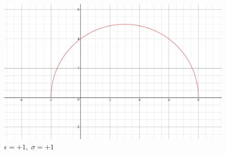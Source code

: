 \begin{figure}[htbp]
 \centering
 \includegraphics[width=\textwidth]{images/foglio3_pos_pos}
	\caption{\(\epsilon=+1, \;\sigma=+1\)}
 \label{figure:pos_pos}
\end{figure}









